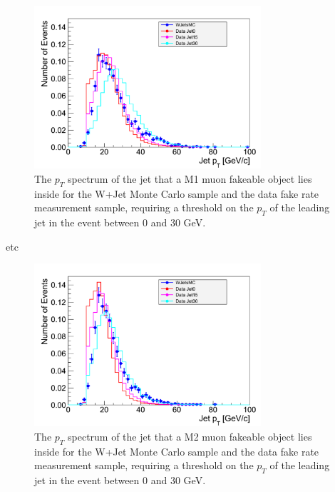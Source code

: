\begin{figure}[!htbp]
\begin{center}
\includegraphics[width=0.75\textwidth]{figures/LeptonJetPt_MuonM1_0To30.pdf}
\caption{The $p_{T}$ spectrum of the jet that a M1 muon fakeable object lies inside for the 
W+Jet Monte Carlo sample and the data fake rate measurement sample, requiring a threshold on the $p_{T}$ of 
the leading jet in the event between $0$ and $30$ GeV.}
\label{fig:mu_M1_fr_jetspectrum0To30}
\end{center}
\end{figure}
etc 
\begin{figure}[!htbp]
\begin{center}
\includegraphics[width=0.75\textwidth]{figures/LeptonJetPt_MuonM2_0To30.pdf}
\caption{The $p_{T}$ spectrum of the jet that a M2 muon fakeable object lies inside for the 
W+Jet Monte Carlo sample and the data fake rate measurement sample, requiring a threshold on the $p_{T}$ of 
the leading jet in the event between $0$ and $30$ GeV.}
\label{fig:mu_M2_fr_jetspectrum0To30}
\end{center}
\end{figure}

